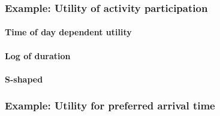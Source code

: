 \subsubsection{Example: Utility of activity participation}
\paragraph{Time of day dependent utility}
\paragraph{Log of duration}
\paragraph{S-shaped}

\subsubsection{Example: Utility for preferred arrival time}
